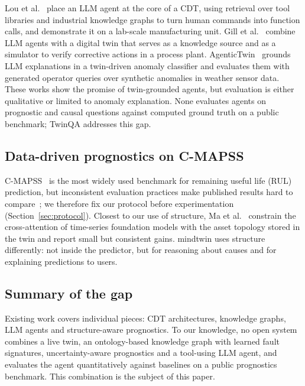 Lou et al.~\citep{lou2025cdtllm} place an LLM agent at the core of a CDT, using retrieval over tool
libraries and industrial knowledge graphs to turn human commands into function calls, and
demonstrate it on a lab-scale manufacturing unit. Gill et al.~\citep{gill2025faulthandling} combine
LLM agents with a digital twin that serves as a knowledge source and as a simulator to verify
corrective actions in a process plant. AgenticTwin~\citep{hasan2026agentictwin} grounds LLM
explanations in a twin-driven anomaly classifier and evaluates them with generated operator
queries over synthetic anomalies in weather sensor data. These works show the promise of
twin-grounded agents, but evaluation is either qualitative or limited to anomaly explanation.
None evaluates agents on prognostic and causal questions against computed ground truth on a
public benchmark; TwinQA addresses this gap.

\subsection{Data-driven prognostics on C-MAPSS}

C-MAPSS~\citep{saxena2008damage} is the most widely used benchmark for remaining useful life (RUL)
prediction, but inconsistent evaluation practices make published results hard to
compare~\citep{ramasso2014benchmarking}; we therefore fix our protocol before experimentation
(Section~\ref{sec:protocol}). Closest to our use of structure, Ma et
al.~\citep{ma2026tsfm} constrain the cross-attention of time-series foundation models with the
asset topology stored in the twin and report small but consistent gains. mindtwin uses structure
differently: not inside the predictor, but for reasoning about causes and for explaining
predictions to users.

\subsection{Summary of the gap}

Existing work covers individual pieces: CDT architectures, knowledge graphs, LLM agents and
structure-aware prognostics. To our knowledge, no open system combines a live twin, an
ontology-based knowledge graph with learned fault signatures, uncertainty-aware prognostics and a
tool-using LLM agent, and evaluates the agent quantitatively against baselines on a public
prognostics benchmark. This combination is the subject of this paper.
